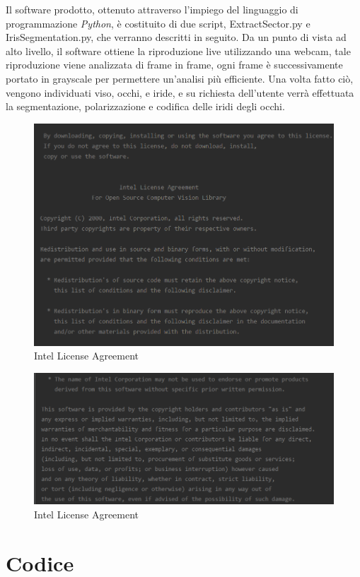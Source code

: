 Il software prodotto, ottenuto attraverso l'impiego del linguaggio di programmazione \emph{Python}, è costituito di due script,  ExtractSector.py e IrisSegmentation.py, che verranno descritti in seguito.
Da un punto di vista ad alto livello, il software ottiene la riproduzione live utilizzando una webcam, tale riproduzione viene analizzata di frame in frame, ogni frame è successivamente portato in grayscale per permettere un'analisi più efficiente.
Una volta fatto ciò, vengono individuati viso, occhi, e iride, e su richiesta dell'utente verrà effettuata la segmentazione, polarizzazione e codifica delle iridi degli occhi.
\begin{figure}[h!]
	\centering
	\includegraphics[width=120mm]{img/5/intel1.png}
	\caption{\fontsize{10px}{0mm}\selectfont Intel License Agreement\label{fig:intel_1_1}}
\end{figure} \newpage
\begin{figure}[h!]
	\centering
	\includegraphics[width=120mm]{img/5/intel2.png}
	\caption{\fontsize{10px}{0mm}\selectfont Intel License Agreement \label{fig:intel_1_2}}
\end{figure}
\newpage
\section{Codice}
\vspace{8mm}
